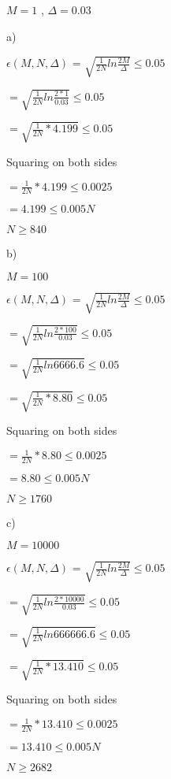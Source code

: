 \documentclass[12pt]{article}
\begin{document}
$M=1$ , $\Delta=0.03$

a)


$\epsilon(M,N,\Delta)$ = $\sqrt{\frac{1}{2N}ln\frac{2M}{\Delta}}\leq 0.05$

$= \sqrt{\frac{1}{2N}ln\frac{2*1}{0.03}}\leq 0.05$

$= \sqrt{\frac{1}{2N}*4.199}\leq 0.05$

Squaring on both sides

$= \frac{1}{2N}*4.199 \leq 0.0025$

$= 4.199 \leq 0.005N$

$N \geq 840$

b)

$M=100$

$\epsilon(M,N,\Delta)$ = $\sqrt{\frac{1}{2N}ln\frac{2M}{\Delta}}\leq 0.05$

$= \sqrt{\frac{1}{2N}ln\frac{2*100}{0.03}}\leq 0.05$

$= \sqrt{\frac{1}{2N}ln6666.6}\leq 0.05$

$= \sqrt{\frac{1}{2N}*8.80}\leq 0.05$

Squaring on both sides

$= \frac{1}{2N}*8.80 \leq 0.0025$

$= 8.80 \leq 0.005N$

$N \geq 1760$


c)

$M=10000$

$\epsilon(M,N,\Delta)$ = $\sqrt{\frac{1}{2N}ln\frac{2M}{\Delta}}\leq 0.05$

$= \sqrt{\frac{1}{2N}ln\frac{2*10000}{0.03}}\leq 0.05$

$= \sqrt{\frac{1}{2N}ln666666.6}\leq 0.05$

$= \sqrt{\frac{1}{2N}*13.410}\leq 0.05$

Squaring on both sides

$= \frac{1}{2N}*13.410 \leq 0.0025$

$= 13.410 \leq 0.005N$

$N \geq 2682$
\end{document}
